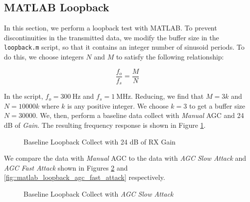 \documentclass{article}
\begin{document}
\subsection{MATLAB Loopback}
\label{section::matlab_loopback_results}

In this section, we perform a loopback test with MATLAB. To prevent discontinuities in the transmitted data, we modify the buffer size in the \texttt{loopback.m} script, so that it contains an integer number of sinusoid periods. To do this, we choose integers $N$ and $M$ to satisfy the following relationship:

\begin{equation}
	\frac{f_o}{f_s} = \frac{M}{N}
\end{equation} 

In the script, $f_o = 300\ \text{Hz}$ and $f_s = 1\ \text{MHz}$. Reducing, we find that $M = 3k$ and $N = 10000k$ where $k$ is any positive integer. We choose $k=3$ to get a buffer size $N = 30000$. We, then, perform a baseline data collect with \textit{Manual} AGC and 24 dB of \textit{Gain}. The resulting frequency response is shown in Figure \ref{fig::matlab_loopback_baseline}.

\begin{figure}[H]
	\centerline{}
	\caption{Baseline Loopback Collect with 24 dB of RX Gain}
	\label{fig::matlab_loopback_baseline}
\end{figure}

We compare the data with \textit{Manual} AGC to the data with \textit{AGC Slow Attack} and \textit{AGC Fast Attack} shown in Figures \ref{fig::matlab_loopback_agc_slow_attack} and \ref{fig::matlab_loopback_agc_fast_attack} respectively.

\begin{figure}[H]
	\centerline{}
	\caption{Baseline Loopback Collect with \textit{AGC Slow Attack}}
	\label{fig::matlab_loopback_agc_slow_attack}
\end{figure}
\end{document}
